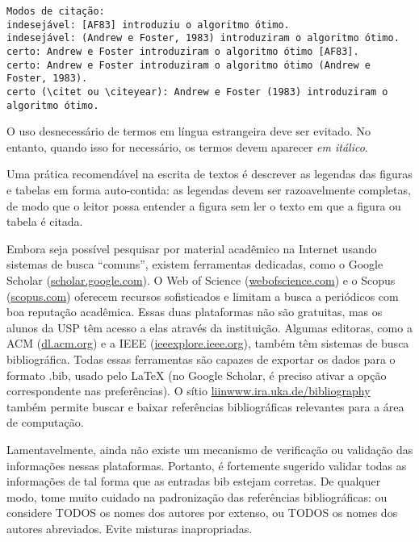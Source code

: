 \footnotesize
\begin{verbatim}
Modos de citação:
indesejável: [AF83] introduziu o algoritmo ótimo.
indesejável: (Andrew e Foster, 1983) introduziram o algoritmo ótimo.
certo: Andrew e Foster introduziram o algoritmo ótimo [AF83].
certo: Andrew e Foster introduziram o algoritmo ótimo (Andrew e Foster, 1983).
certo (\citet ou \citeyear): Andrew e Foster (1983) introduziram o algoritmo ótimo.
\end{verbatim}
\normalsize

\enlargethispage{.5\baselineskip}

O uso desnecessário de termos em língua estrangeira deve ser evitado. No entanto,
quando isso for necessário, os termos devem aparecer \textit{em itálico}.

Uma prática recomendável na escrita de textos é descrever as
legendas das figuras e tabelas em forma auto-contida: as
legendas devem ser razoavelmente completas, de modo que o leitor possa entender
a figura sem ler o texto em que a figura ou tabela é citada.


Embora seja possível pesquisar por material acadêmico na Internet usando
sistemas de busca ``comuns'', existem ferramentas dedicadas, como o
\textsf{Google Scholar} (\url{scholar.google.com}).
O \textsf{Web of Science}
(\url{webofscience.com}) e o \textsf{Scopus} (\url{scopus.com})
oferecem recursos sofisticados e limitam a busca a periódicos com boa
reputação acadêmica. Essas duas plataformas não são gratuitas, mas os alunos
da USP têm acesso a elas através da instituição. Algumas editoras, como a
ACM (\url{dl.acm.org}) e a IEEE (\url{ieeexplore.ieee.org}), também têm
sistemas de busca bibliográfica. Todas essas ferramentas são capazes de
exportar os dados para o formato .bib, usado pelo \LaTeX{} (no Google
Scholar, é preciso ativar a opção correspondente nas preferências). O sítio
\url{liinwww.ira.uka.de/bibliography} também permite buscar e baixar
referências bibliográficas relevantes para a área de computação.

Lamentavelmente, ainda não existe um mecanismo de verificação ou validação
das informações nessas plataformas. Portanto, é fortemente sugerido validar
todas as informações de tal forma que as entradas bib estejam corretas.
De qualquer modo, tome muito cuidado na padronização das referências
bibliográficas: ou considere TODOS os nomes dos autores por extenso, ou
TODOS os nomes dos autores abreviados. Evite misturas inapropriadas.

